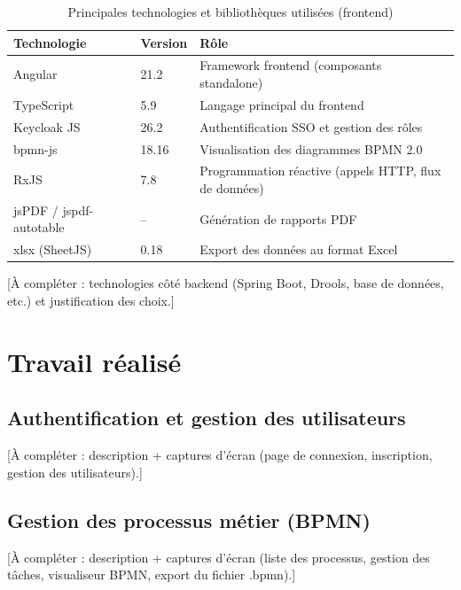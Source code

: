 \begin{table}[H]
    \centering
    \begin{tabularx}{\textwidth}{l l X}
        \toprule
        \textbf{Technologie} & \textbf{Version} & \textbf{R\^ole} \\
        \midrule
        Angular & 21.2 & Framework frontend (composants standalone) \\
        TypeScript & 5.9 & Langage principal du frontend \\
        Keycloak JS & 26.2 & Authentification SSO et gestion des r\^oles \\
        bpmn-js & 18.16 & Visualisation des diagrammes BPMN 2.0 \\
        RxJS & 7.8 & Programmation r\'eactive (appels HTTP, flux de donn\'ees) \\
        jsPDF / jspdf-autotable & -- & G\'en\'eration de rapports PDF \\
        xlsx (SheetJS) & 0.18 & Export des donn\'ees au format Excel \\
        \bottomrule
    \end{tabularx}
    \caption{Principales technologies et biblioth\`eques utilis\'ees (frontend)}
    \label{tab:technologies}
\end{table}

[\`A compl\'eter : technologies c\^ot\'e backend (Spring Boot, Drools, base
de donn\'ees, etc.) et justification des choix.]

\section{Travail r\'ealis\'e}

\subsection{Authentification et gestion des utilisateurs}
[\`A compl\'eter : description + captures d'\'ecran (page de connexion,
inscription, gestion des utilisateurs).]

\subsection{Gestion des processus m\'etier (BPMN)}
[\`A compl\'eter : description + captures d'\'ecran (liste des processus,
gestion des t\^aches, visualiseur BPMN, export du fichier .bpmn).]

